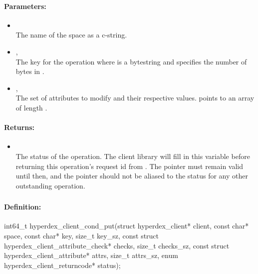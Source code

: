 \paragraph{Parameters:}
\begin{itemize}[noitemsep]
\item {}\\
The name of the space as a c-string.
\item {}, \\
The key for the operation where  is a bytestring and  specifies the number of bytes in .
\item {}, \\
The set of attributes to modify and their respective values.   points to an array of length .
\end{itemize}

\paragraph{Returns:}
\begin{itemize}[noitemsep]
\item {}\\
The status of the operation.  The client library will fill in this variable before returning this operation's request id from .  The pointer must remain valid until then, and the pointer should not be aliased to the status for any other outstanding operation.
\end{itemize}

\pagebreak
\subsubsection{}
\label{api:c:cond_put}


\paragraph{Definition:}
\begin{ccode}
int64_t hyperdex_client_cond_put(struct hyperdex_client* client,
        const char* space,
        const char* key, size_t key_sz,
        const struct hyperdex_client_attribute_check* checks, size_t checks_sz,
        const struct hyperdex_client_attribute* attrs, size_t attrs_sz,
        enum hyperdex_client_returncode* status);
\end{ccode}

